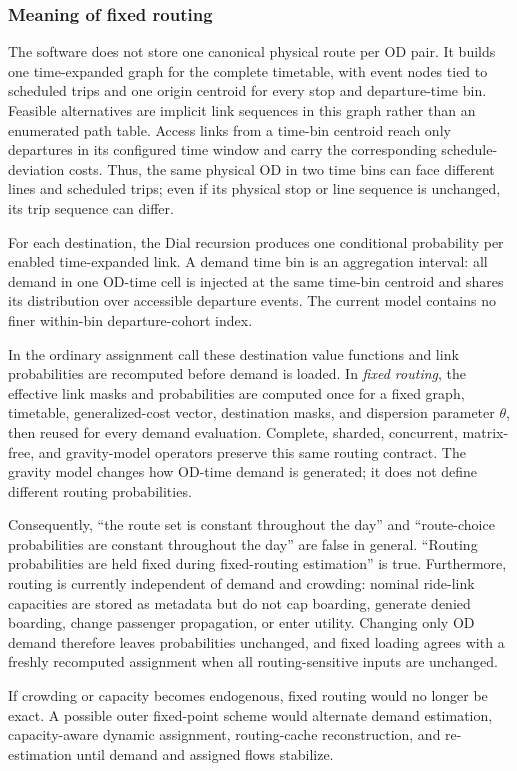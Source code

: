 \subsubsection{Meaning of fixed routing}

The software does not store one canonical physical route per OD pair. It builds one time-expanded graph for the
complete timetable, with event nodes tied to scheduled trips and one origin centroid for every stop and departure-time
bin. Feasible alternatives are implicit link sequences in this graph rather than an enumerated path table. Access links
from a time-bin centroid reach only departures in its configured time window and carry the corresponding schedule-
deviation costs. Thus, the same physical OD in two time bins can face different lines and scheduled trips; even if its
physical stop or line sequence is unchanged, its trip sequence can differ.

For each destination, the Dial recursion produces one conditional probability per enabled time-expanded link. A demand
time bin is an aggregation interval: all demand in one OD-time cell is injected at the same time-bin centroid and shares
its distribution over accessible departure events. The current model contains no finer within-bin departure-cohort
index.

In the ordinary assignment call these destination value functions and link probabilities are recomputed before demand
is loaded. In \emph{fixed routing}, the effective link masks and probabilities are computed once for a fixed graph,
timetable, generalized-cost vector, destination masks, and dispersion parameter $\theta$, then reused for every demand
evaluation. Complete, sharded, concurrent, matrix-free, and gravity-model operators preserve this same routing contract.
The gravity model changes how OD-time demand is generated; it does not define different routing probabilities.

Consequently, ``the route set is constant throughout the day'' and ``route-choice probabilities are constant throughout
the day'' are false in general. ``Routing probabilities are held fixed during fixed-routing estimation'' is true.
Furthermore, routing is currently independent of demand and crowding: nominal ride-link capacities are stored as
metadata but do not cap boarding, generate denied boarding, change passenger propagation, or enter utility. Changing
only OD demand therefore leaves probabilities unchanged, and fixed loading agrees with a freshly recomputed assignment
when all routing-sensitive inputs are unchanged.

If crowding or capacity becomes endogenous, fixed routing would no longer be exact. A possible outer fixed-point scheme
would alternate demand estimation, capacity-aware dynamic assignment, routing-cache reconstruction, and re-estimation
until demand and assigned flows stabilize.


